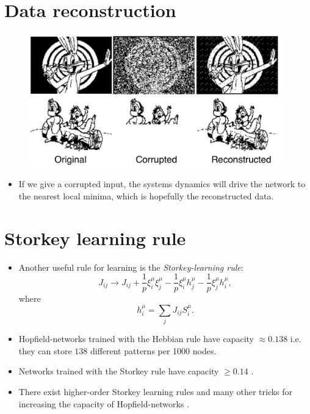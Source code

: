\documentclass[12pt]{article}
\numberwithin{equation}{section}
\begin{document}
\newpage
\section*{Data reconstruction}
\begin{figure}[h!]
    \centering
    \includegraphics[height=0.5\textheight]{images/hopfield-reconstruction.png}
\end{figure}
\begin{itemize}
    \item If we give a corrupted input, the systems dynamics will drive the network to the
    nearest local minima, which is hopefully the reconstructed data.
\end{itemize}

\newpage
\section*{Storkey learning rule}
\begin{itemize}
    \item Another useful rule for learning is the \textit{Storkey-learning rule}:
    \begin{equation*}
        J_{ij} \rightarrow J_{ij} + \frac{1}{p}\xi_i^{\mu}\xi_j^{\mu} - \frac{1}{p}\xi^{\mu}_i h^{\mu}_j - \frac{1}{p}\xi^{\mu}_j h^{\mu}_i,
    \end{equation*}
    where
    \begin{equation*}
        h^{\mu}_i = \sum\limits_j J_{ij}S_i^{\mu}.
    \end{equation*}
    \item Hopfield-networks trained with the Hebbian rule have capacity $\approx 0.138$ i.e. they can store $138$
    different patterns per 1000 nodes.
    \item Networks trained with the Storkey rule have capacity $\geq 0.14$ \cite{Liou1999}.
    \item There exist higher-order Storkey learning rules and many other tricks for increasing the capacity of 
    Hopfield-networks \cite{aboudib:hal-01058303}.
\end{itemize}
\end{document}
